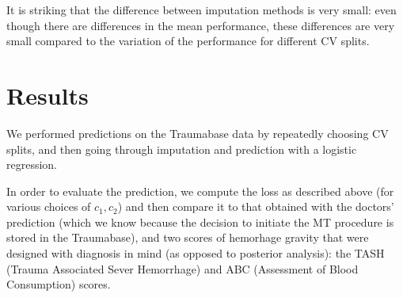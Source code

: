 %

It is striking that the difference between imputation methods is very small: even though there are differences in the mean performance, these differences are very small compared to the variation of the performance for different CV splits.

	\section{Results}
We performed predictions on the Traumabase data by repeatedly choosing CV splits, and then going through imputation and prediction with a logistic regression. 

In order to evaluate the prediction, we compute the loss as described above (for various choices of $c_1,c_2$) and then compare it to that obtained with the doctors' prediction (which we know because the decision to initiate the MT procedure is stored in the Traumabase), and two scores of hemorhage gravity that were designed with diagnosis in mind (as opposed to posterior analysis): the TASH (Trauma Associated Sever Hemorrhage)\cite{yucel2006tash} and ABC (Assessment of Blood Consumption)\cite{nunez2009ABC} scores.
	\label{results}